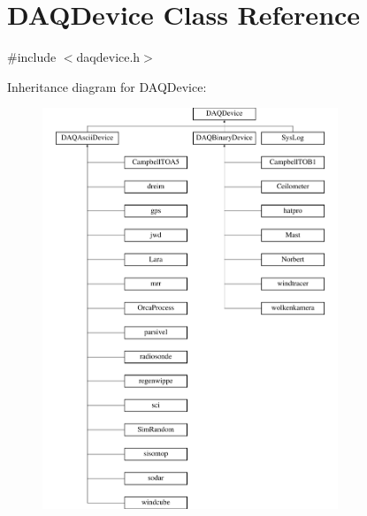 \hypertarget{classDAQDevice}{\section{D\-A\-Q\-Device Class Reference}
\label{classDAQDevice}
}


{\ttfamily \#include $<$daqdevice.\-h$>$}

Inheritance diagram for D\-A\-Q\-Device\-:\begin{figure}[H]
\begin{center}
\leavevmode
\includegraphics[height=12.000000cm]{classDAQDevice}
\end{center}
\end{figure}
